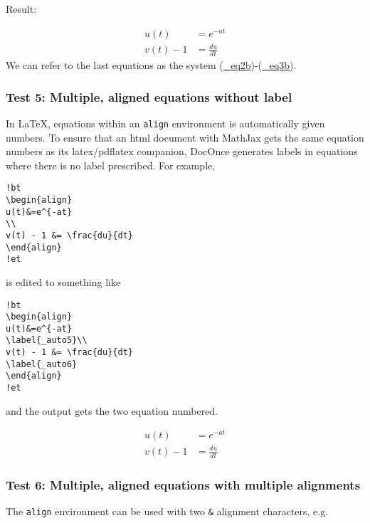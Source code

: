 \documentclass[]{article}
\begin{document}
Result:

\[
\begin{align}
u(t)&=e^{-at}
\label{_eq2b}\\ 
v(t) - 1 &= \frac{du}{dt}
\label{_eq3b}
\end{align}
\] We can refer to the last equations as the system
(\protect\hyperlink{ux5feq2b}{\_eq2b})-(\protect\hyperlink{ux5feq3b}{\_eq3b}).

\subsubsection{Test 5: Multiple, aligned equations without
label}\label{test-5-multiple-aligned-equations-without-label}

In LaTeX, equations within an \texttt{align} environment is
automatically given numbers. To ensure that an html document with
MathJax gets the same equation numbers as its latex/pdflatex companion,
DocOnce generates labels in equations where there is no label
prescribed. For example,

\begin{verbatim}
!bt
\begin{align}
u(t)&=e^{-at}
\\ 
v(t) - 1 &= \frac{du}{dt}
\end{align}
!et
\end{verbatim}

is edited to something like

\begin{verbatim}
!bt
\begin{align}
u(t)&=e^{-at}
\label{_auto5}\\ 
v(t) - 1 &= \frac{du}{dt}
\label{_auto6}
\end{align}
!et
\end{verbatim}

and the output gets the two equation numbered.

\[
\begin{align}
u(t)&=e^{-at}\\ 
v(t) - 1 &= \frac{du}{dt}
\end{align}
\]

\subsubsection{Test 6: Multiple, aligned equations with multiple
alignments}\label{test-6-multiple-aligned-equations-with-multiple-alignments}

The \texttt{align} environment can be used with two \texttt{\&}
alignment characters, e.g.
\end{document}
